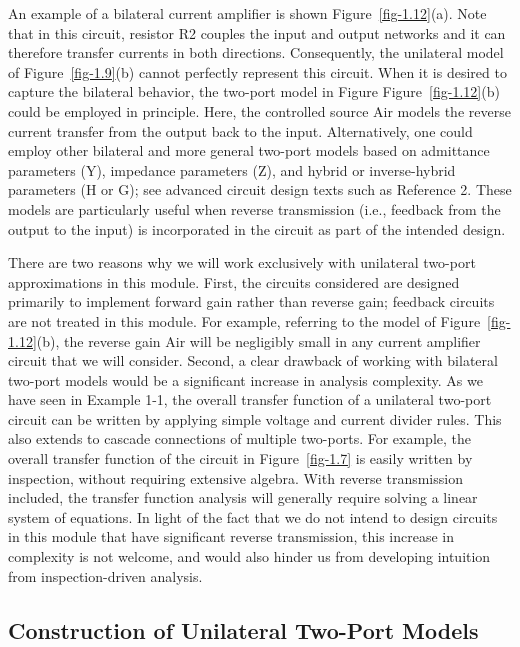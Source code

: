 \documentclass[
  11pt,
  letterpaper,
  abstract]{scrbook}
\begin{document}
An example of a bilateral current amplifier is shown
Figure~\ref{fig-1.12}(a). Note that in this circuit, resistor R2 couples
the input and output networks and it can therefore transfer currents in
both directions. Consequently, the unilateral model of
Figure~\ref{fig-1.9}(b) cannot perfectly represent this circuit. When it
is desired to capture the bilateral behavior, the two-port model in
Figure Figure~\ref{fig-1.12}(b) could be employed in principle. Here,
the controlled source Air models the reverse current transfer from the
output back to the input. Alternatively, one could employ other
bilateral and more general two-port models based on admittance
parameters (Y), impedance parameters (Z), and hybrid or inverse-hybrid
parameters (H or G); see advanced circuit design texts such as Reference
2. These models are particularly useful when reverse transmission (i.e.,
feedback from the output to the input) is incorporated in the circuit as
part of the intended design.

There are two reasons why we will work exclusively with unilateral
two-port approximations in this module. First, the circuits considered
are designed primarily to implement forward gain rather than reverse
gain; feedback circuits are not treated in this module. For example,
referring to the model of Figure~\ref{fig-1.12}(b), the reverse gain Air
will be negligibly small in any current amplifier circuit that we will
consider. Second, a clear drawback of working with bilateral two-port
models would be a significant increase in analysis complexity. As we
have seen in Example 1-1, the overall transfer function of a unilateral
two-port circuit can be written by applying simple voltage and current
divider rules. This also extends to cascade connections of multiple
two-ports. For example, the overall transfer function of the circuit in
Figure~\ref{fig-1.7} is easily written by inspection, without requiring
extensive algebra. With reverse transmission included, the transfer
function analysis will generally require solving a linear system of
equations. In light of the fact that we do not intend to design circuits
in this module that have significant reverse transmission, this increase
in complexity is not welcome, and would also hinder us from developing
intuition from inspection-driven analysis.

\subsection{Construction of Unilateral Two-Port
Models}\label{construction-of-unilateral-two-port-models}
\end{document}
